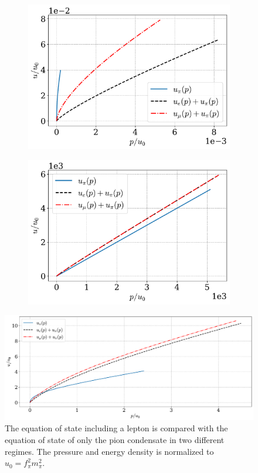 \begin{figure}
    \centering
    \begin{subfigure}{0.49\textwidth}
        \includegraphics[width=\textwidth]{../scripts/figurer/charge_neutrality/eos_nr.pdf}
    \end{subfigure}
    \begin{subfigure}{0.49\textwidth}
        \includegraphics[width=\textwidth]{../scripts/figurer/charge_neutrality/eos_ur.pdf}
    \end{subfigure}
    \includegraphics[width=\textwidth]{../scripts/figurer/charge_neutrality/eos_I.pdf}
    \caption{
        The equation of state including a lepton is compared with the equation of state of only the pion condensate in two different regimes.
        The pressure and energy density is normalized to $u_0 = f_\pi^2 m_\pi^2$.
    }
    \label{fig: eos with leptons}
\end{figure}


